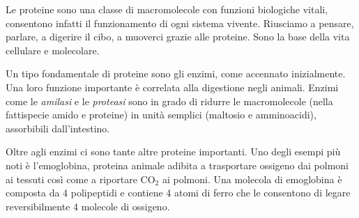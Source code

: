 \par Le proteine sono una classe di macromolecole con funzioni biologiche vitali, consentono infatti il funzionamento di ogni sistema vivente. Riusciamo a pensare, parlare, a digerire il cibo, a muoverci grazie alle proteine. Sono la base della vita cellulare e molecolare. 

\par Un tipo fondamentale di proteine sono gli enzimi, come accennato inizialmente. Una loro funzione importante è correlata alla digestione negli animali. Enzimi come le \textit{amilasi} e le \textit{proteasi} sono in grado di ridurre le macromolecole (nella fattispecie amido e proteine) in unità semplici (maltosio e amminoacidi), assorbibili dall'intestino.

\par Oltre agli enzimi ci sono tante altre proteine importanti. Uno degli esempi più noti è l'emoglobina, proteina animale adibita a trasportare ossigeno dai polmoni ai tessuti così come a riportare CO$_{2}$ ai polmoni. Una molecola di emoglobina è composta da 4 polipeptidi e contiene 4 atomi di ferro che le consentono di legare reversibilmente 4 molecole di ossigeno.

